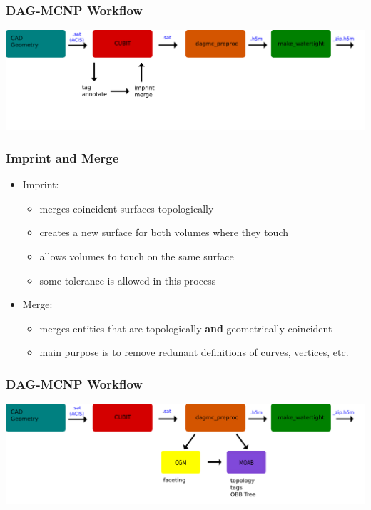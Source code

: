 \documentclass[14pt]{beamer}
\begin{document}
\begin{frame}
\frametitle{DAG-MCNP Workflow}
\begin{center}
\includegraphics[scale=0.23, trim = 40 200 0 0]{DAGMC_Wrkflw2.png}
\end{center}
\end{frame}

\begin{frame}
\frametitle{Imprint and Merge}
\begin{itemize}
\item Imprint:
	\begin{itemize}
	\item merges coincident surfaces topologically
    \item creates a new surface for both volumes where they touch
    \item allows volumes to touch on the same surface
    \item some tolerance is allowed in this process
	\end{itemize}
\item Merge:
	\begin{itemize}
	\item merges entities that are topologically
	\textbf{and} geometrically coincident
	\item main purpose is to remove redunant definitions of curves, vertices, etc.
	\end{itemize}
\end{itemize}

\end{frame}



\begin{frame}
\frametitle{DAG-MCNP Workflow}
\begin{center}
\includegraphics[scale=0.23, trim = 40 200 0 0 ]{DAGMC_Wrkflw3.png}
\end{center}
\end{frame}
\end{document}
